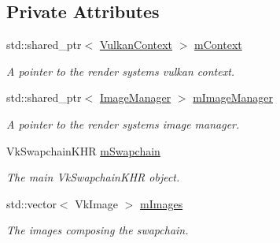 \subsection*{Private Attributes}
\begin{DoxyCompactItemize}
\item 
\mbox{\label{class_swapchain_afff59cb515df67eed0071c16df52ce54}} 
std\+::shared\+\_\+ptr$<$ \mbox{\hyperlink{class_vulkan_context}{Vulkan\+Context}} $>$ \mbox{\hyperlink{class_swapchain_afff59cb515df67eed0071c16df52ce54}{m\+Context}}
\begin{DoxyCompactList}\small\item\em A pointer to the render system\textquotesingle{}s vulkan context. \end{DoxyCompactList}\item 
\mbox{\label{class_swapchain_a24df69e9676376e4b0693aa63e326b75}} 
std\+::shared\+\_\+ptr$<$ \mbox{\hyperlink{class_image_manager}{Image\+Manager}} $>$ \mbox{\hyperlink{class_swapchain_a24df69e9676376e4b0693aa63e326b75}{m\+Image\+Manager}}
\begin{DoxyCompactList}\small\item\em A pointer to the render system\textquotesingle{}s image manager. \end{DoxyCompactList}\item 
\mbox{\label{class_swapchain_a99f0c2f692e70a77e248f63ad3cabcad}} 
Vk\+Swapchain\+K\+HR \mbox{\hyperlink{class_swapchain_a99f0c2f692e70a77e248f63ad3cabcad}{m\+Swapchain}}
\begin{DoxyCompactList}\small\item\em The main Vk\+Swapchain\+K\+HR object. \end{DoxyCompactList}\item 
\mbox{\label{class_swapchain_af51061cfadd48e6f7b1cab08a84fe2a3}} 
std\+::vector$<$ Vk\+Image $>$ \mbox{\hyperlink{class_swapchain_af51061cfadd48e6f7b1cab08a84fe2a3}{m\+Images}}
\begin{DoxyCompactList}\small\item\em The images composing the swapchain. \end{DoxyCompactList}\item 
\mbox{\label{class_swapchain_a80d5a80de6cf5c9392ea712429b57534}} 

\end{DoxyCompactItemize}
